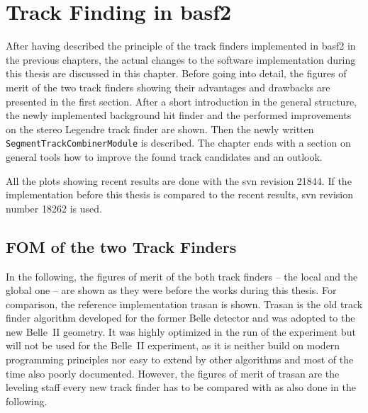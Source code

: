 \chapter{Track Finding in basf2} \label{chapter-workflow}

After having described the principle of the track finders implemented in basf2 in the previous chapters, the actual changes to the software implementation during this thesis are discussed in this chapter. Before going into detail, the figures of merit of the two track finders showing their advantages and drawbacks are presented in the first section. After a short introduction in the general structure, the newly implemented background hit finder and the performed improvements on the stereo Legendre track finder are shown. Then the newly written \texttt{SegmentTrackCombinerModule} is described. The chapter ends with a section on general tools how to improve the found track candidates and an outlook.

All the plots showing recent results are done with the svn revision 21844. If the implementation before this thesis is compared to the recent results, svn revision number 18262 is used.

\section{FOM of the two Track Finders} \label{section-fom}

In the following, the figures of merit of the both track finders -- the local and the global one -- are shown as they were before the works during this thesis. For comparison, the reference implementation trasan is shown. Trasan is the old track finder algorithm developed for the former Belle detector and was adopted to the new Belle~II geometry. It was highly optimized in the run of the experiment but will not be used for the Belle~II experiment, as it is neither build on modern programming principles nor easy to extend by other algorithms and most of the time also poorly documented. However, the figures of merit of trasan are the leveling staff every new track finder has to be compared with as also done in the following.

